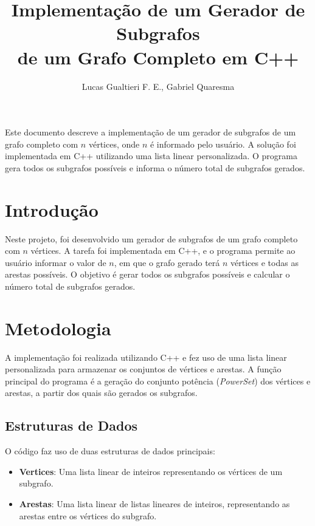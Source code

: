 \documentclass[12pt]{article}
\title { Implementação de um Gerador de Subgrafos \\ de um Grafo Completo em C++ }
\author {Lucas Gualtieri F. E.\inst{1}, Gabriel Quaresma \inst{1} }
\begin{document}
 

\maketitle

\begin{resumo}
    Este documento descreve a implementação de um gerador de subgrafos de um grafo completo com \(n\) vértices, onde \(n\) é informado pelo usuário. A solução foi implementada em C++ utilizando uma lista linear personalizada. O programa gera todos os subgrafos possíveis e informa o número total de subgrafos gerados.
\end{resumo}

\section{Introdução}
    Neste projeto, foi desenvolvido um gerador de subgrafos de um grafo completo com \(n\) vértices. A tarefa foi implementada em C++, e o programa permite ao usuário informar o valor de \(n\), em que o grafo gerado terá \(n\) vértices e todas as arestas possíveis. O objetivo é gerar todos os subgrafos possíveis e calcular o número total de subgrafos gerados.

\section{Metodologia}
    A implementação foi realizada utilizando C++ e fez uso de uma lista linear personalizada para armazenar os conjuntos de vértices e arestas. A função principal do programa é a geração do conjunto potência (\textit{PowerSet}) dos vértices e arestas, a partir dos quais são gerados os subgrafos.

\subsection{Estruturas de Dados}
O código faz uso de duas estruturas de dados principais:
\begin{itemize}
    \item \textbf{Vertices}: Uma lista linear de inteiros representando os vértices de um subgrafo.
    \item \textbf{Arestas}: Uma lista linear de listas lineares de inteiros, representando as arestas entre os vértices do subgrafo.
\end{itemize}
\end{document}
